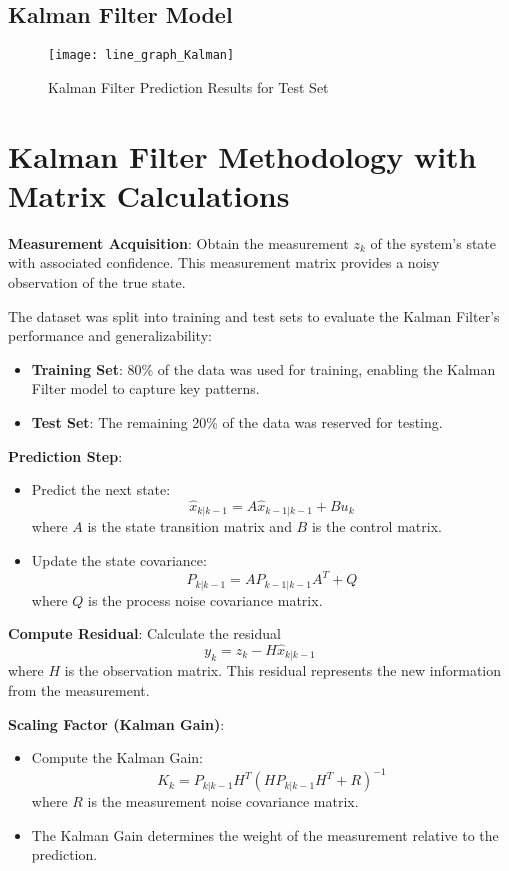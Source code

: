 \subsection{Kalman Filter Model}

\begin{figure}[H]
	\centering
	\texttt{[image: line\_graph\_Kalman]}
	\caption{Kalman Filter Prediction Results for Test Set}
	\label{fig:Kalman_result}
\end{figure}

\section*{Kalman Filter Methodology with Matrix Calculations}

\textbf{Measurement Acquisition}: Obtain the measurement \( z_k \) of the system's state with associated confidence. This measurement matrix provides a noisy observation of the true state.

The dataset was split into training and test sets to evaluate the Kalman Filter's performance and generalizability:
\begin{itemize}
	\item \textbf{Training Set}: 80\% of the data was used for training, enabling the Kalman Filter model to capture key patterns.
	\item \textbf{Test Set}: The remaining 20\% of the data was reserved for testing.
\end{itemize}

\textbf{Prediction Step}:
\begin{itemize}
	\item Predict the next state:
	\[
	\hat{x}_{k|k-1} = A \hat{x}_{k-1|k-1} + B u_k
	\]
	where \( A \) is the state transition matrix and \( B \) is the control matrix.
	
	\item Update the state covariance:
	\[
	P_{k|k-1} = A P_{k-1|k-1} A^T + Q
	\]
	where \( Q \) is the process noise covariance matrix.
\end{itemize}

\textbf{Compute Residual}: Calculate the residual
\[
y_k = z_k - H \hat{x}_{k|k-1}
\]
where \( H \) is the observation matrix. This residual represents the new information from the measurement.

\textbf{Scaling Factor (Kalman Gain)}:
\begin{itemize}
	\item Compute the Kalman Gain:
	\[
	K_k = P_{k|k-1} H^T (H P_{k|k-1} H^T + R)^{-1}
	\]
	where \( R \) is the measurement noise covariance matrix.
	
	\item The Kalman Gain determines the weight of the measurement relative to the prediction.
\end{itemize}

